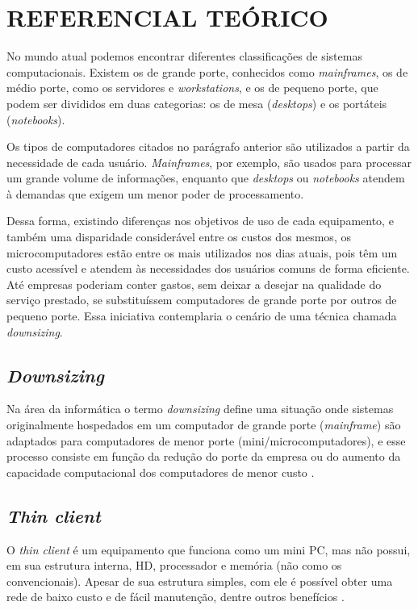 \chapter{REFERENCIAL TEÓRICO}

No mundo atual podemos encontrar diferentes classificações de sistemas computacionais. Existem os de grande porte, conhecidos como \textit{mainframes}, os de médio porte, como os servidores e \textit{workstations}, e os de pequeno porte, que podem ser divididos em duas categorias: os de mesa (\textit{desktops}) e os portáteis (\textit{notebooks}).

Os tipos de computadores citados no parágrafo anterior são utilizados a partir da necessidade de cada usuário. \textit{Mainframes}, por exemplo, são usados para processar um grande volume de informações, enquanto que \textit{desktops} ou \textit{notebooks} atendem à demandas que exigem um menor poder de processamento.

Dessa forma, existindo diferenças nos objetivos de uso de cada equipamento, e também uma disparidade considerável entre os custos dos mesmos, os microcomputadores estão entre os mais utilizados nos dias atuais, pois têm um custo acessível e atendem às necessidades dos usuários comuns de forma eficiente. Até empresas poderiam conter gastos, sem deixar a desejar na qualidade do serviço prestado, se substituíssem computadores de grande porte por outros de pequeno porte. Essa iniciativa contemplaria o cenário de uma técnica chamada \textit{downsizing}.

\section{\textit{Downsizing}}

Na área da informática o termo \textit{downsizing} define uma situação onde sistemas originalmente hospedados em um computador de grande porte (\textit{mainframe}) são adaptados para computadores de menor porte (mini/microcomputadores), e esse processo consiste em função da redução do porte da empresa ou do aumento da capacidade computacional dos computadores de menor custo \cite{WIKIPEDIA3}.

\section{\textit{Thin client}}

O \textit{thin client} é um equipamento que funciona como um mini PC, mas não possui, em sua estrutura interna, HD, processador e memória (não como os convencionais). Apesar de sua estrutura simples, com ele é possível obter uma rede de baixo custo e de fácil manutenção, dentre outros benefícios \cite{THINCLIENT}.

